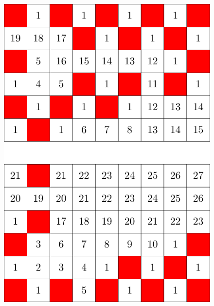 






\begin{figure}[]
\centering
\includegraphics[width=\textwidth]{figures/4/6x9x2_numbered_heatmap.pdf}
\caption{}
\label{fig:6x9x2}
\end{figure} 

